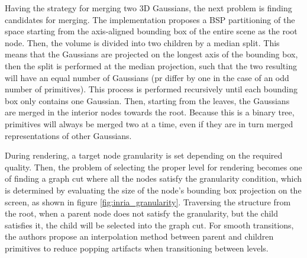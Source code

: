 Having the strategy for merging two 3D Gaussians, the next problem is finding candidates for merging. The implementation proposes a BSP partitioning of the space starting from the axis-aligned bounding box of the entire scene as the root node. Then, the volume is divided into two children by a median split. This means that the Gaussians are projected on the longest axis of the bounding box, then the split is performed at the median projection, such that the two resulting will have an equal number of Gaussians (pr differ by one in the case of an odd number of primitives). This process is performed recursively until each bounding box only contains one Gaussian. Then, starting from the leaves, the Gaussians are merged in the interior nodes towards the root. Because this is a binary tree, primitives will always be merged two at a time, even if they are in turn merged representations of other Gaussians.

During rendering, a target node granularity is set depending on the required quality. Then, the problem of selecting the proper level for rendering becomes one of finding a graph cut where all the nodes satisfy the granularity condition, which is determined by evaluating the size of the node's bounding box projection on the screen, as shown in figure \ref{fig:inria_granularity}. Traversing the structure from the root, when a parent node does not satisfy the granularity, but the child satisfies it, the child will be selected into the graph cut. For smooth transitions, the authors propose an interpolation method between parent and children primitives to reduce popping artifacts when transitioning between levels.

